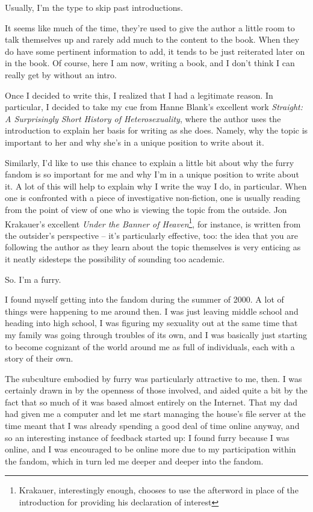 Usually, I'm the type to skip past introductions.

It seems like much of the time, they're used to give the author a little room to talk themselves up and rarely add much to the content to the book. When they do have some pertinent information to add, it tends to be just reiterated later on in the book. Of course, here I am now, writing a book, and I don't think I can really get by without an intro.

Once I decided to write this, I realized that I had a legitimate reason. In particular, I decided to take my cue from Hanne Blank's excellent work \emph{Straight: A Surprisingly Short History of Heterosexuality}, where the author uses the introduction to explain her basis for writing as she does. Namely, why the topic is important to her and why she's in a unique position to write about it.

Similarly, I'd like to use this chance to explain a little bit about why the furry fandom is so important for me and why I'm in a unique position to write about it. A lot of this will help to explain why I write the way I do, in particular. When one is confronted with a piece of investigative non-fiction, one is usually reading from the point of view of one who is viewing the topic from the outside. Jon Krakauer's excellent \emph{Under the Banner of Heaven}\footnote{Krakauer, interestingly enough, chooses to use the afterword in place of the introduction for providing his declaration of interest}, for instance, is written from the outsider's perspective -- it's particularly effective, too: the idea that you are following the author as they learn about the topic themselves is very enticing as it neatly sidesteps the possibility of sounding too academic.

So. I'm a furry.

I found myself getting into the fandom during the summer of 2000. A lot of things were happening to me around then. I was just leaving middle school and heading into high school, I was figuring my sexuality out at the same time that my family was going through troubles of its own, and I was basically just starting to become cognizant of the world around me as full of individuals, each with a story of their own.

The subculture embodied by furry was particularly attractive to me, then. I was certainly drawn in by the openness of those involved, and aided quite a bit by the fact that so much of it was based almost entirely on the Internet. That my dad had given me a computer and let me start managing the house's file server at the time meant that I was already spending a good deal of time online anyway, and so an interesting instance of feedback started up: I found furry because I was online, and I was encouraged to be online more due to my participation within the fandom, which in turn led me deeper and deeper into the fandom.

